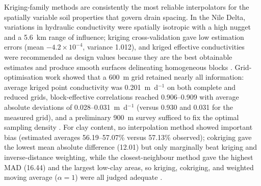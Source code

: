 \documentclass[11pt]{article}
\begin{document}
Kriging-family methods are consistently the most reliable interpolators for the
spatially variable soil properties that govern drain spacing. In the Nile Delta,
variations in hydraulic conductivity were spatially isotropic with a high nugget
and a 5.6~km range of influence; kriging cross-validation gave low estimation
errors (mean $-4.2\times10^{-4}$, variance 1.012), and kriged effective
conductivities were recommended as design values because they are the best
obtainable estimates and produce smooth surfaces delineating homogeneous blocks
\parencite{GALLICHAND1991}. Grid-optimisation work showed that a 600~m grid
retained nearly all information: average kriged point conductivity was
0.201~m~d$^{-1}$ on both complete and reduced grids, block-effective correlations
reached 0.906--0.909 with average absolute deviations of 0.028--0.031~m~d$^{-1}$
(versus 0.930 and 0.031 for the measured grid), and a preliminary 900~m survey
sufficed to fix the optimal sampling density \parencite{GALLICHAND1992}. For clay
content, no interpolation method showed important bias (estimated averages
56.19--57.07\% versus 57.13\% observed); cokriging gave the lowest mean absolute
difference (12.01) but only marginally beat kriging and inverse-distance
weighting, while the closest-neighbour method gave the highest MAD (16.44) and
the largest low-clay areas, so kriging, cokriging, and weighted moving average
($\alpha=1$) were all judged adequate \parencite{GALLICHAND1993}.
\end{document}

